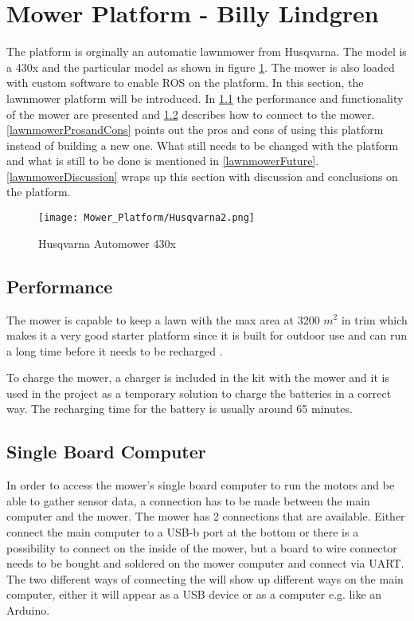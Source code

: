 \section{Mower Platform - Billy Lindgren}
\noindent
The platform is orginally an automatic lawnmower from Husqvarna. The model is a 430x and the particular model as shown in figure \ref{Husqvarnamower}. The mower is also loaded with custom software to enable ROS on the platform.
In this section, the lawnmower platform will be introduced. In \ref{lawnmowerPerformance} the performance and functionality of the mower are presented and \ref{lawnmowerConnect} describes how to connect to the mower. \ref{lawnmowerProsandCons} points out the pros and cons of using this platform instead of building a new one. What still needs to be changed with the platform and what is still to be done is mentioned in \ref{lawnmowerFuture}. \ref{lawnmowerDiscussion} wraps up this section with discussion and conclusions on the platform.

\begin{figure}
  \caption{Husqvarna Automower 430x}
  \centering
 \texttt{[image: Mower\_Platform/Husqvarna2.png]}\label{Husqvarnamower}
\end{figure}
 
 
\subsection{Performance}\label{lawnmowerPerformance}
\noindent
The mower is capable to keep a lawn with the max area at 3200 $m^{2}$ in trim which makes it a very good starter platform since it is built for outdoor use and can run a long time before it needs to be recharged \cite{Husqvarnalawnmower}.
 
To charge the mower, a charger is included in the kit with the mower and it is used in the project as a temporary solution to charge the batteries in a correct way. The recharging time for the battery is usually around 65 minutes.
 
 
\subsection{Single Board Computer}\label{lawnmowerConnect}
\noindent
In order to access the mower's single board computer to run the motors and be able to gather sensor data, a connection has to be made between the main computer and the mower. The mower has 2 connections that are available. Either connect the main computer to a USB-b port at the bottom or there is a possibility to connect on the inside of the mower, but a board to wire connector needs to be bought and soldered on the mower computer and connect via UART. The two different ways of connecting the will show up different ways on the main computer, either it will appear as a USB device or as a computer e.g. like an Arduino.


